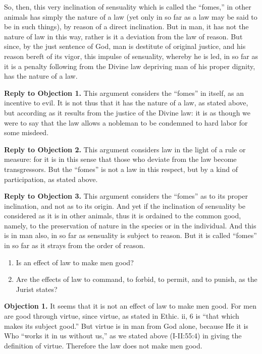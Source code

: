 So, then, this very inclination of sensuality which is called the ``fomes,'' in other animals has simply the nature of a law (yet only in so far as a law may be said to be in such things), by reason of a direct inclination. But in man, it has not the nature of law in this way, rather is it a deviation from the law of reason. But since, by the just sentence of God, man is destitute of original justice, and his reason bereft of its vigor, this impulse of sensuality, whereby he is led, in so far as it is a penalty following from the Divine law depriving man of his proper dignity, has the nature of a law.

\textbf{Reply to Objection 1.} This argument considers the ``fomes'' in itself, as an incentive to evil. It is not thus that it has the nature of a law, as stated above, but according as it results from the justice of the Divine law: it is as though we were to say that the law allows a nobleman to be condemned to hard labor for some misdeed.

\textbf{Reply to Objection 2.} This argument considers law in the light of a rule or measure: for it is in this sense that those who deviate from the law become transgressors. But the ``fomes'' is not a law in this respect, but by a kind of participation, as stated above.

\textbf{Reply to Objection 3.} This argument considers the ``fomes'' as to its proper inclination, and not as to its origin. And yet if the inclination of sensuality be considered as it is in other animals, thus it is ordained to the common good, namely, to the preservation of nature in the species or in the individual. And this is in man also, in so far as sensuality is subject to reason. But it is called ``fomes'' in so far as it strays from the order of reason.


\begin{enumerate}

\item  Is an effect of law to make men good? 
\item  Are the effects of law to command, to forbid, to permit, and to punish, as the Jurist states? 
\end{enumerate}


\textbf{Objection 1.} It seems that it is not an effect of law to make men good. For men are good through virtue, since virtue, as stated in Ethic. ii, 6 is ``that which makes its subject good.'' But virtue is in man from God alone, because He it is Who ``works it in us without us,'' as we stated above (I-II:55:4) in giving the definition of virtue. Therefore the law does not make men good.

